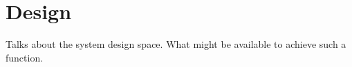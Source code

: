 
\section{Design}
\label{sec:design}

Talks about the system design space.
What might be available to achieve such a function.



